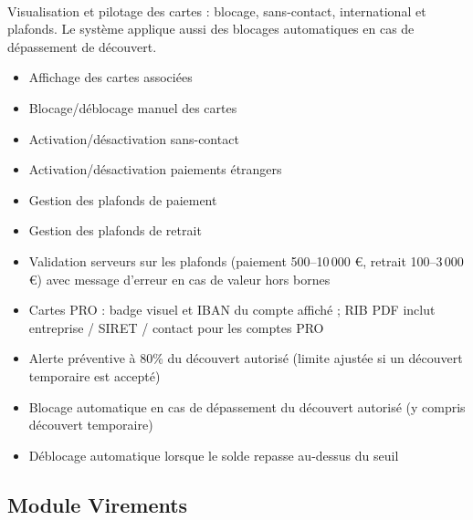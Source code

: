 \documentclass[12pt,a4paper]{report}
\begin{document}
\paragraph{}Visualisation et pilotage des cartes : blocage, sans-contact, international et plafonds. Le système applique aussi des blocages automatiques en cas de dépassement de découvert.
\begin{itemize}[leftmargin=1.5cm]
    \item Affichage des cartes associées
    \item Blocage/déblocage manuel des cartes
    \item Activation/désactivation sans-contact
    \item Activation/désactivation paiements étrangers
    \item Gestion des plafonds de paiement
    \item Gestion des plafonds de retrait
    \item Validation serveurs sur les plafonds (paiement 500--10\,000 €, retrait 100--3\,000 €) avec message d'erreur en cas de valeur hors bornes
    \item Cartes PRO : badge visuel et IBAN du compte affiché ; RIB PDF inclut entreprise / SIRET / contact pour les comptes PRO
    \item Alerte préventive à 80\% du découvert autorisé (limite ajustée si un découvert temporaire est accepté)
    \item Blocage automatique en cas de dépassement du découvert autorisé (y compris découvert temporaire)
    \item Déblocage automatique lorsque le solde repasse au-dessus du seuil
\end{itemize}

\subsection{Module Virements}
\end{document}
